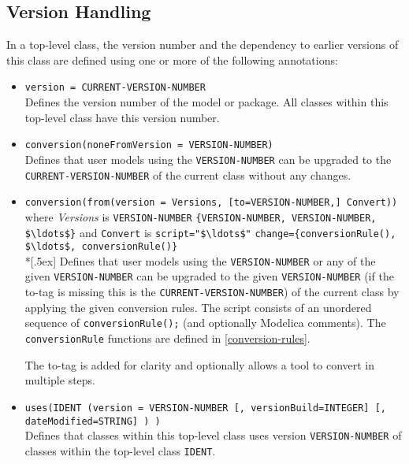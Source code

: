\subsection{Version Handling}\label{version-handling}

In a top-level class, the version number and the dependency to earlier versions of this class are defined using one or more of the following annotations:
\begin{itemize}
\item
  \lstinline!version = CURRENT-VERSION-NUMBER!\\
  Defines the version number of the model or package.
  All classes within this top-level class have this version number.
\item
  \lstinline!conversion(noneFromVersion = VERSION-NUMBER)!\\
  Defines that user models using the \lstinline!VERSION-NUMBER! can be upgraded to the \lstinline!CURRENT-VERSION-NUMBER! of the current class without any changes.
\item
  \lstinline!conversion(from(version = Versions, [to=VERSION-NUMBER,] Convert))!\\
  where \emph{Versions} is \lstinline!VERSION-NUMBER! \textbar{} \lstinline!{VERSION-NUMBER, VERSION-NUMBER, $\ldots$}! and \lstinline!Convert! is \lstinline!script="$\ldots$"! \textbar{} \lstinline!change={conversionRule(), $\ldots$, conversionRule()}!\\*[.5ex]
  Defines that user models using the \lstinline!VERSION-NUMBER! or any of the given \lstinline!VERSION-NUMBER! can be upgraded to the given \lstinline!VERSION-NUMBER! (if the to-tag is missing this is the \lstinline!CURRENT-VERSION-NUMBER!) of the current class by applying the given conversion rules.
  The script consists of an unordered sequence of \lstinline!conversionRule();! (and optionally Modelica comments).
  The \lstinline!conversionRule! functions are defined in \cref{conversion-rules}.

  \begin{nonnormative}
  The to-tag is added for clarity and optionally allows a tool to convert in multiple steps.
  \end{nonnormative}
\item
  \lstinline!uses(IDENT (version = VERSION-NUMBER [, versionBuild=INTEGER] [, dateModified=STRING] ) )!\\
  Defines that classes within this top-level class uses version \lstinline!VERSION-NUMBER! of classes within the top-level class \lstinline!IDENT!.
\end{itemize}

